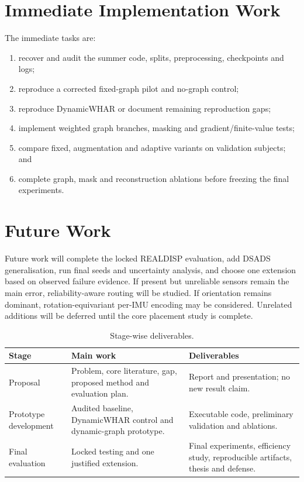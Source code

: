 \documentclass[12pt,a4paper,twoside,openright]{report}
\begin{document}
\section{Immediate Implementation Work}
The immediate tasks are:
\begin{enumerate}
\item recover and audit the summer code, splits, preprocessing, checkpoints and logs;
\item reproduce a corrected fixed-graph pilot and no-graph control;
\item reproduce DynamicWHAR or document remaining reproduction gaps;
\item implement weighted graph branches, masking and gradient/finite-value tests;
\item compare fixed, augmentation and adaptive variants on validation subjects; and
\item complete graph, mask and reconstruction ablations before freezing the final experiments.
\end{enumerate}

\section{Future Work}
Future work will complete the locked REALDISP evaluation, add DSADS generalisation, run final seeds and uncertainty analysis, and choose one extension based on observed failure evidence. If present but unreliable sensors remain the main error, reliability-aware routing will be studied. If orientation remains dominant, rotation-equivariant per-IMU encoding may be considered. Unrelated additions will be deferred until the core placement study is complete.

\begin{table}[hbt!]
\centering
\small
\renewcommand{\arraystretch}{1.3}
\caption{Stage-wise deliverables.}
\label{tab:deliverables}
\begin{tabularx}{\textwidth}{@{}P{0.20\textwidth}P{0.42\textwidth}Y@{}}
\toprule
\textbf{Stage} & \textbf{Main work} & \textbf{Deliverables} \\
\midrule
Proposal & Problem, core literature, gap, proposed method and evaluation plan. & Report and presentation; no new result claim. \\
Prototype development & Audited baseline, DynamicWHAR control and dynamic-graph prototype. & Executable code, preliminary validation and ablations. \\
Final evaluation & Locked testing and one justified extension. & Final experiments, efficiency study, reproducible artifacts, thesis and defense. \\
\bottomrule
\end{tabularx}
\end{table}
\end{document}

